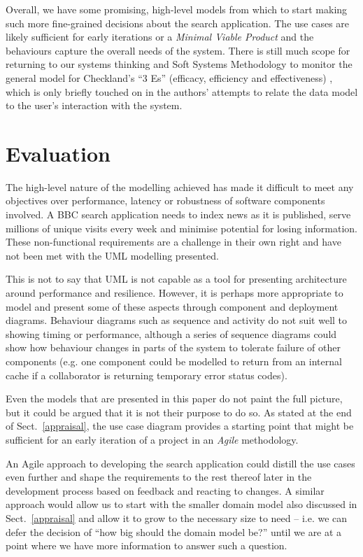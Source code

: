 \documentclass[oribibl]{llncs}
\begin{document}
Overall, we have some promising, high-level models from which to
start making such more fine-grained decisions about the search
application. The use cases are likely sufficient for early iterations
or a \emph{Minimal Viable Product} \citep{junk2000dynamic} and
the behaviours capture the overall needs of the system. There is still
much scope for returning to our systems thinking and Soft Systems
Methodology to monitor the general model for Checkland's ``3 Es''
(efficacy, efficiency and effectiveness) \citep{checkland1990soft},
which is only briefly touched on in the authors' attempts to relate the
data model to the user's interaction with the system.

\section{Evaluation}
\label{evaluation}

The high-level nature of the modelling achieved has made it
difficult to meet any objectives over performance, latency or
robustness of software components involved. A BBC search application
needs to index news as it is published, serve millions of unique
visits every week and minimise potential for losing information. These
non-functional requirements are a challenge in their own right
and have not been met with the UML modelling presented.

This is not to say that UML is not capable as a tool for presenting
architecture around performance and resilience. However, it is perhaps
more appropriate to model and present some of these aspects through
component and deployment diagrams. Behaviour diagrams such as sequence
and activity do not suit well to showing timing or performance, although
a series of sequence diagrams could show how behaviour changes
in parts of the system to tolerate failure of other components (e.g.
one component could be modelled to return from an internal cache if
a collaborator is returning temporary error status codes).

Even the models that are presented in this paper do not paint the full
picture, but it could be argued that it is not their purpose to do so.
As stated at the end of Sect.~\ref{appraisal}, the use case diagram
provides a starting point that might be sufficient for an early
iteration of a project in an \emph{Agile} methodology. \citep{beck2001agile}

An Agile approach to developing the search application could distill
the use cases even further and shape the requirements to the rest
thereof later in the development process based on feedback and reacting
to changes. A similar approach would allow us to start with the smaller
domain model also discussed in Sect.~\ref{appraisal} and allow it to grow
to the necessary size to need -- i.e. we can defer the decision of ``how big
should the domain model be?'' until we are at a point where we have more
information to answer such a question.
\end{document}

